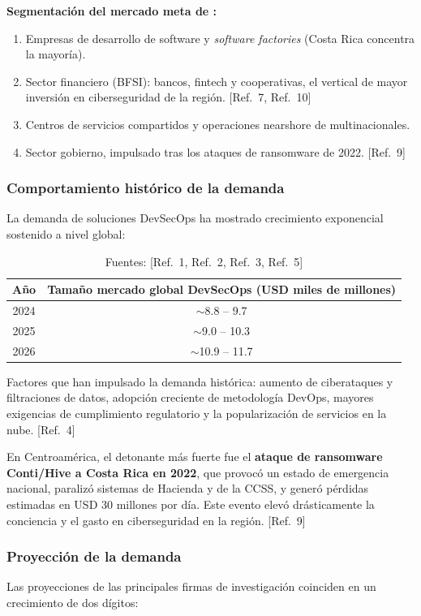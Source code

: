 \noindent\textbf{Segmentación del mercado meta de \NombreProducto:}
\begin{enumerate}
  \item Empresas de desarrollo de software y \emph{software factories} (Costa Rica
        concentra la mayoría).
  \item Sector financiero (BFSI): bancos, fintech y cooperativas, el vertical de mayor
        inversión en ciberseguridad de la región. [Ref.~7, Ref.~10]
  \item Centros de servicios compartidos y operaciones nearshore de multinacionales.
  \item Sector gobierno, impulsado tras los ataques de ransomware de 2022. [Ref.~9]
\end{enumerate}

\subsubsection{Comportamiento histórico de la demanda}
La demanda de soluciones DevSecOps ha mostrado crecimiento exponencial sostenido a
nivel global:

\begin{table}[ht]
  \centering
  \begin{tabular}{cc}
    \toprule
    \textbf{Año} & \textbf{Tamaño mercado global DevSecOps (USD miles de millones)} \\
    \midrule
    2024 & $\sim$8.8 -- 9.7 \\
    2025 & $\sim$9.0 -- 10.3 \\
    2026 & $\sim$10.9 -- 11.7 \\
    \bottomrule
  \end{tabular}
  \caption{Fuentes: [Ref.~1, Ref.~2, Ref.~3, Ref.~5]}
\end{table}

Factores que han impulsado la demanda histórica: aumento de ciberataques y filtraciones
de datos, adopción creciente de metodología DevOps, mayores exigencias de cumplimiento
regulatorio y la popularización de servicios en la nube. [Ref.~4]

En Centroamérica, el detonante más fuerte fue el \textbf{ataque de ransomware
Conti/Hive a Costa Rica en 2022}, que provocó un estado de emergencia nacional,
paralizó sistemas de Hacienda y de la CCSS, y generó pérdidas estimadas en USD 30
millones por día. Este evento elevó drásticamente la conciencia y el gasto en
ciberseguridad en la región. [Ref.~9]

\subsubsection{Proyección de la demanda}
Las proyecciones de las principales firmas de investigación coinciden en un crecimiento
de dos dígitos:


